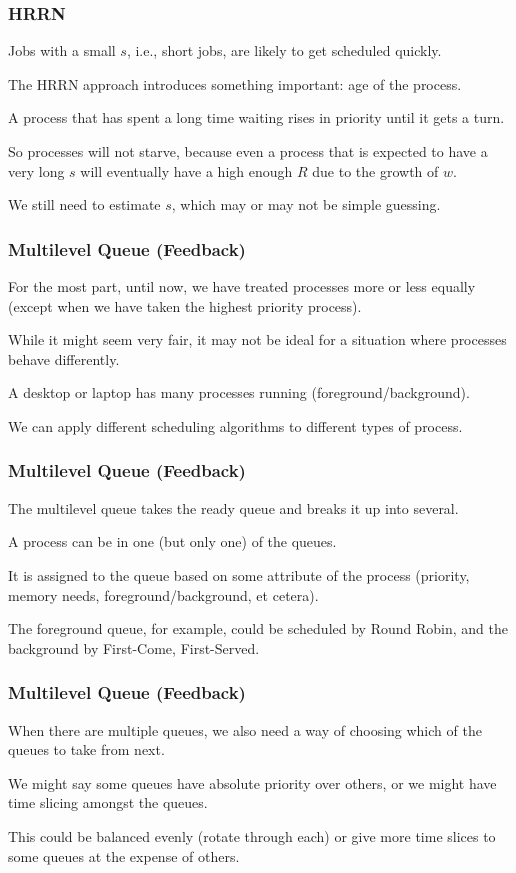 \begin{frame}
\frametitle{HRRN}

Jobs with a small $s$, i.e., short jobs, are likely to get scheduled quickly. 

The HRRN approach introduces something important: age of the process. 


A process that has spent a long time waiting rises in priority until it gets a turn. 

So processes will not starve, because even a process that is expected to have a very long $s$ will eventually have a high enough $R$ due to the growth of $w$.

We still need to estimate $s$, which may or may not be simple guessing. 


\end{frame}

\begin{frame}
\frametitle{Multilevel Queue (Feedback)}

For the most part, until now, we have treated processes more or less equally (except when we have taken the highest priority process). 

While it might seem very fair, it may not be ideal for a situation where processes behave differently. 

A desktop or laptop has many processes running (foreground/background). 

We can apply different scheduling algorithms to different types of process.

\end{frame}

\begin{frame}
\frametitle{Multilevel Queue (Feedback)}

The multilevel queue takes the ready queue and breaks it up into several. 

A process can be in one (but only one) of the queues. 

It is assigned to the queue based on some attribute of the process (priority, memory needs, foreground/background, et cetera). 

The foreground queue, for example, could be scheduled by Round Robin, and the background by First-Come, First-Served.


\end{frame}

\begin{frame}
\frametitle{Multilevel Queue (Feedback)}

When there are multiple queues, we also need a way of choosing which of the queues to take from next. 

We might say some queues have absolute priority over others, or we might have time slicing amongst the queues. 

This could be balanced evenly (rotate through each) or give more time slices to some queues at the expense of others.

\end{frame}

